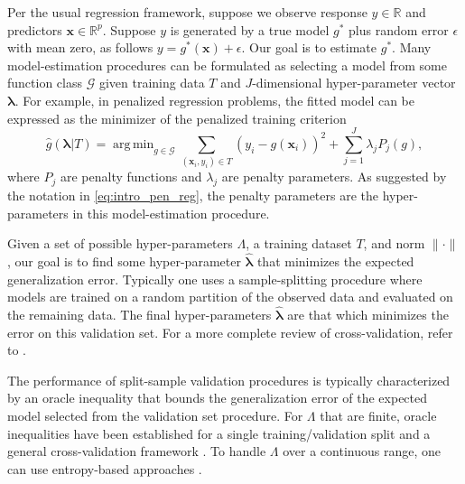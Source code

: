 \documentclass[12pt]{article} %
\theoremstyle{definition}
\DeclareMathOperator*{\argmin}{arg\,min}
\begin{document}
Per the usual regression framework, suppose we observe response $y \in \mathbb{R}$ and predictors $\boldsymbol {x} \in \mathbb{R}^p$. Suppose $y$ is generated by a true model $g^*$ plus random error $\epsilon$ with mean zero, as follows
$y = g^*(\boldsymbol x) + \epsilon$.
Our goal is to estimate $g^*$.
Many model-estimation procedures can be formulated as selecting a model from some function class $\mathcal{G}$ given training data $T$ and $J$-dimensional hyper-parameter vector $\boldsymbol{\lambda}$. For example, in penalized regression problems, the fitted model can be expressed as the minimizer of the penalized training criterion
\begin{equation}
\label{eq:intro_pen_reg}
\hat{g}(\boldsymbol \lambda | T) = \argmin_{g\in \mathcal{G}} \sum_{(\boldsymbol{x}_i, y_i) \in T} \left (y_i -  g(\boldsymbol{x}_i) \right )^2 + \sum_{j=1}^J \lambda_j P_j(g),
\end{equation}
where $P_j$ are penalty functions and $\lambda_j$ are penalty parameters. As suggested by the notation in \eqref{eq:intro_pen_reg}, the penalty parameters are the hyper-parameters in this model-estimation procedure.

Given a set of possible hyper-parameters $\Lambda$, a training dataset $T$, and norm $\|\cdot\|$,
our goal is to find some hyper-parameter $\hat{\boldsymbol{\lambda}}$ that minimizes the expected generalization error.
Typically one uses a sample-splitting procedure where models are trained on a random partition of the observed data and evaluated on the remaining data.
The final hyper-parameters $\hat{\boldsymbol{\lambda}}$ are that which minimizes the error on this validation set.
For a more complete review of cross-validation, refer to \citet{arlot2010survey}.

The performance of split-sample validation procedures is typically characterized by an oracle inequality that bounds the generalization error of the expected model selected from the validation set procedure. For $\Lambda$ that are finite, oracle inequalities have been established for a single training/validation split \citep{gyorfi2006distribution} and a general cross-validation framework \citep{van2003unified, van2004asymptotic}. To handle $\Lambda$ over a continuous range, one can use entropy-based approaches \citep{lecue2012oracle}.
\end{document}
